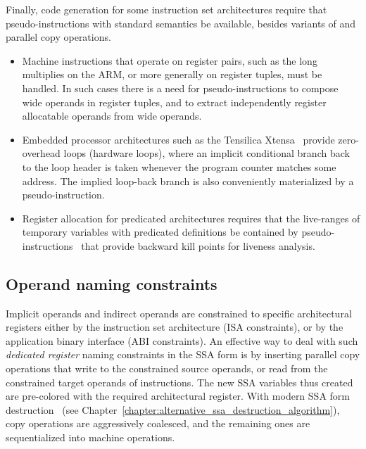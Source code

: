 Finally, code generation for some instruction set architectures require that
pseudo-instructions with standard semantics be available, besides variants of
\phifuns and parallel copy operations. \begin{itemize}

\item Machine instructions that operate on register pairs, such as the long
multiplies on the ARM, or more generally on register tuples, must be handled. In such
cases there is a need for pseudo-instructions to compose wide operands in
register tuples, and to extract independently register allocatable operands from
wide operands.

\item Embedded processor architectures such as the Tensilica Xtensa~\cite{Gonzalez:2000:IEEEMicro} provide zero-overhead loops (hardware
loops), where an implicit conditional branch back to the loop header is taken
whenever the program counter matches some address. The implied loop-back branch
is also conveniently materialized by a pseudo-instruction.

\item Register allocation for predicated architectures requires that the live-ranges
of temporary variables with predicated definitions be contained by
pseudo-instructions~\cite{Gillies:1996:MICRO} that provide backward kill points for liveness analysis.

\end{itemize}

\subsection{Operand naming constraints}

Implicit operands and indirect operands are constrained to specific
architectural registers either by the instruction set architecture (ISA
constraints), or by the application binary interface (ABI constraints). An
effective way to deal with such \emph{dedicated register} naming constraints in
the SSA form is by inserting parallel copy operations that write to the
constrained source operands, or read from the constrained target operands of
instructions. The new SSA variables thus created are pre-colored with the
required architectural register. With modern SSA form destruction~\cite{Sreedhar:1999:SAS,boissinot09revisiting} (see Chapter~\ref{chapter:alternative_ssa_destruction_algorithm}), copy operations are aggressively
coalesced, and the remaining ones are sequentialized into machine operations.

